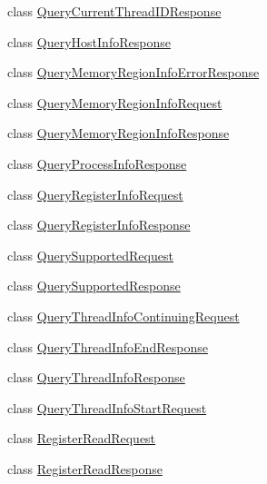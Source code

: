 \begin{DoxyCompactItemize}
class \mbox{\hyperlink{classxd_1_1dbg_1_1gdbstub_1_1pkt_1_1_query_current_thread_i_d_response}{Query\+Current\+Thread\+I\+D\+Response}}
\item 
class \mbox{\hyperlink{classxd_1_1dbg_1_1gdbstub_1_1pkt_1_1_query_host_info_response}{Query\+Host\+Info\+Response}}
\item 
class \mbox{\hyperlink{classxd_1_1dbg_1_1gdbstub_1_1pkt_1_1_query_memory_region_info_error_response}{Query\+Memory\+Region\+Info\+Error\+Response}}
\item 
class \mbox{\hyperlink{classxd_1_1dbg_1_1gdbstub_1_1pkt_1_1_query_memory_region_info_request}{Query\+Memory\+Region\+Info\+Request}}
\item 
class \mbox{\hyperlink{classxd_1_1dbg_1_1gdbstub_1_1pkt_1_1_query_memory_region_info_response}{Query\+Memory\+Region\+Info\+Response}}
\item 
class \mbox{\hyperlink{classxd_1_1dbg_1_1gdbstub_1_1pkt_1_1_query_process_info_response}{Query\+Process\+Info\+Response}}
\item 
class \mbox{\hyperlink{classxd_1_1dbg_1_1gdbstub_1_1pkt_1_1_query_register_info_request}{Query\+Register\+Info\+Request}}
\item 
class \mbox{\hyperlink{classxd_1_1dbg_1_1gdbstub_1_1pkt_1_1_query_register_info_response}{Query\+Register\+Info\+Response}}
\item 
class \mbox{\hyperlink{classxd_1_1dbg_1_1gdbstub_1_1pkt_1_1_query_supported_request}{Query\+Supported\+Request}}
\item 
class \mbox{\hyperlink{classxd_1_1dbg_1_1gdbstub_1_1pkt_1_1_query_supported_response}{Query\+Supported\+Response}}
\item 
class \mbox{\hyperlink{classxd_1_1dbg_1_1gdbstub_1_1pkt_1_1_query_thread_info_continuing_request}{Query\+Thread\+Info\+Continuing\+Request}}
\item 
class \mbox{\hyperlink{classxd_1_1dbg_1_1gdbstub_1_1pkt_1_1_query_thread_info_end_response}{Query\+Thread\+Info\+End\+Response}}
\item 
class \mbox{\hyperlink{classxd_1_1dbg_1_1gdbstub_1_1pkt_1_1_query_thread_info_response}{Query\+Thread\+Info\+Response}}
\item 
class \mbox{\hyperlink{classxd_1_1dbg_1_1gdbstub_1_1pkt_1_1_query_thread_info_start_request}{Query\+Thread\+Info\+Start\+Request}}
\item 
class \mbox{\hyperlink{classxd_1_1dbg_1_1gdbstub_1_1pkt_1_1_register_read_request}{Register\+Read\+Request}}
\item 
class \mbox{\hyperlink{classxd_1_1dbg_1_1gdbstub_1_1pkt_1_1_register_read_response}{Register\+Read\+Response}}

\end{DoxyCompactItemize}
